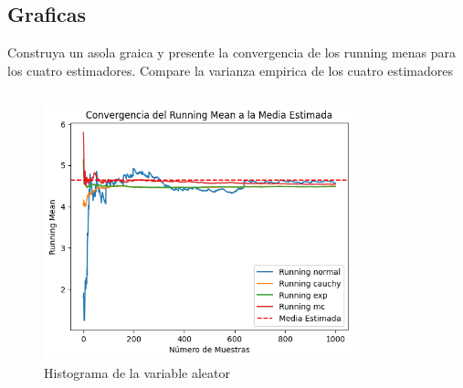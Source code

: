 \documentclass{article}
\begin{document}
\subsection{Graficas}
Construya un asola graica y presente la convergencia de los running menas para los cuatro estimadores. Compare la varianza empirica de los
cuatro estimadores

\begin{pythonbox}
	\inputminted{python}{code/all_graphs.py}
\end{pythonbox}


\begin{figure}[H]
	\centering
	\includegraphics[width=0.8\textwidth]{assets/graph.png}
	\caption{Histograma de la variable aleator}
\end{figure}
\end{document}
